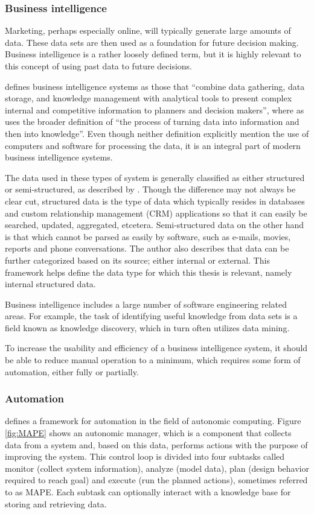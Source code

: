 \documentclass{sig-alternate}
\begin{document}
\subsubsection{Business intelligence}
Marketing, perhaps especially online, will typically generate large amounts of data. These data sets are then used as a foundation for future decision making. Business intelligence is a rather loosely defined term, but it is highly relevant to this concept of using past data to future decisions.

\cite{Negash2004} defines business intelligence systems as those that ``combine data gathering, data storage, and knowledge management with analytical tools to present complex internal and competitive information to planners and decision makers'', where as \cite{Golfarelli2004} uses the broader definition of ``the process of turning data into information and then into knowledge''. Even though neither definition explicitly mention the use of computers and software for processing the data, it is an integral part of modern business intelligence systems.

The data used in these types of system is generally classified as either structured or semi-structured, as described by \cite{Negash2004}. Though the difference may not always be clear cut, structured data is the type of data which typically resides in databases and custom relationship management (CRM) applications so that it can easily be searched, updated, aggregated, etcetera. Semi-structured data on the other hand is that which cannot be parsed as easily by software, such as e-mails, movies, reports and phone conversations. The author also describes that data can be further categorized based on its source; either internal or external. This framework helps define the data type for which this thesis is relevant, namely internal structured data.

Business intelligence includes a large number of software engineering related areas. For example, the task of identifying useful knowledge from data sets is a field known as knowledge discovery, which in turn often utilizes data mining.

To increase the usability and efficiency of a business intelligence system, it should be able to reduce manual operation to a minimum, which requires some form of automation, either fully or partially.

\subsubsection{Automation}
\cite{IBM2006} defines a framework for automation in the field of autonomic computing. Figure \ref{fig:MAPE} shows an autonomic manager, which is a component that collects data from a system and, based on this data, performs actions with the purpose of improving the system. This control loop is divided into four subtasks called monitor (collect system information), analyze (model data), plan (design behavior required to reach goal) and execute (run the planned actions), sometimes referred to as MAPE. Each subtask can optionally interact with a knowledge base for storing and retrieving data.
\end{document}
